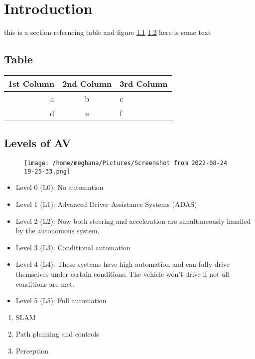 \documentclass[a4paper,12pt]{article}
\begin{document}
	\section{Introduction}
	this is a section referncing table and figure
	\ref{table}
	\ref{av}
	here is some text
	\newpage
	\subsection{Table}
	\label{table}
	\begin{tabular}{r|cl}
		1st Column & 2nd Column & 3rd Column\\
		\hline
		a & b & c\\
		\cline{2-3}
		d & e & f\\
	\end{tabular}
	\newpage
	\subsection{Levels of AV}
	\label{av}
	\begin{figure}
		\centering
		\texttt{[image: /home/meghana/Pictures/Screenshot from 2022-08-24 19-25-33.png]}
	\end{figure}
	\begin{itemize}
		\item Level 0 (L0): No automation
		\item Level 1 (L1): Advanced Driver Assistance Systems (ADAS) 
		\item Level 2 (L2): Now both steering and acceleration are simultaneously handled by the autonomous system. 
		\item Level 3 (L3): Conditional automation 
		\item Level 4 (L4): These systems have high automation and can fully drive themselves under certain conditions. The vehicle won’t drive if not all conditions are met.  
		\item Level 5 (L5): Full automation
	\end{itemize}
\begin{enumerate}
	\item SLAM
	\item Path planning and controls
	\item Perception 
\end{enumerate}
	
\end{document}

